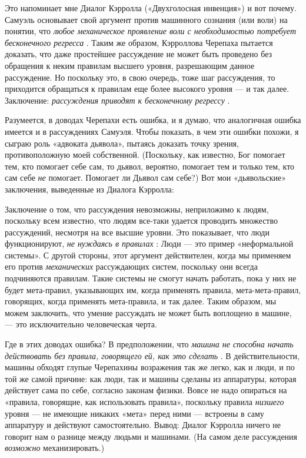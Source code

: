 Это напоминает мне Диалог Кэрролла («Двухголосная инвенция») и вот почему. Самуэль основывает свой аргумент против машинного сознания (или воли) на понятии, что \emph{любое механическое проявление воли с необходимостью потребует бесконечного регресса} . Таким же образом, Кэрроллова Черепаха пытается доказать, что даже простейшее рассуждение не может быть проведено без обращения к неким правилам высшего уровня, разрешающим данное рассуждение. Но поскольку это, в свою очередь, тоже шаг рассуждения, то приходится обращаться к правилам еще более высокого уровня --- и так далее. Заключение: \emph{рассуждения приводят к бесконечному регрессу} .

Разумеется, в доводах Черепахи есть ошибка, и я думаю, что аналогичная ошибка имеется и в рассуждениях Самуэля. Чтобы показать, в чем эти ошибки похожи, я сыграю роль «адвоката дьявола», пытаясь доказать точку зрения, противоположную моей собственной. (Поскольку, как известно, Бог помогает тем, кто помогает себе сам, то дьявол, вероятно, помогает тем и только тем, кто сам себе \emph{не} помогает. Помогает ли Дьявол сам себе?) Вот мои «дьявольские» заключения, выведенные из Диалога Кэрролла:

Заключение о том, что рассуждения невозможны, неприложимо к людям, поскольку всем известно, что людям все-таки удается проводить множество рассуждений, несмотря на все высшие уровни. Это показывает, что люди функционируют, \emph{не нуждаясь в правилах} : Люди --- это пример «неформальной системы». С другой стороны, этот аргумент действителен, когда мы применяем его против \emph{механических} рассуждающих систем, поскольку они всегда подчиняются правилам. Такие системы не смогут начать работать, пока у них не будет мета-правил, указывающих им, когда применять правила, мета-мета-правил, говорящих, когда применять мета-правила, и так далее. Таким образом, мы можем заключить, что умение рассуждать не может быть воплощено в машине, --- это исключительно человеческая черта.

Где в этих доводах ошибка? В предположении, что \emph{машина не способна начать действовать без правила, говорящего ей, как это сделать} . В действительности, машины обходят глупые Черепахины возражения так же легко, как и люди, и по той же самой причине: как люди, так и машины сделаны из аппаратуры, которая действует сама по себе, согласно законам физики. Вовсе не надо опираться на «правила, говорящие, как использовать правила», поскольку правила \emph{низшего} уровня --- не имеющие никаких «мета» перед ними --- встроены в саму аппаратуру и действуют самостоятельно. Вывод: Диалог Кэрролла ничего не говорит нам о разнице между людьми и машинами. (На самом деле рассуждения \emph{возможно} механизировать.)


